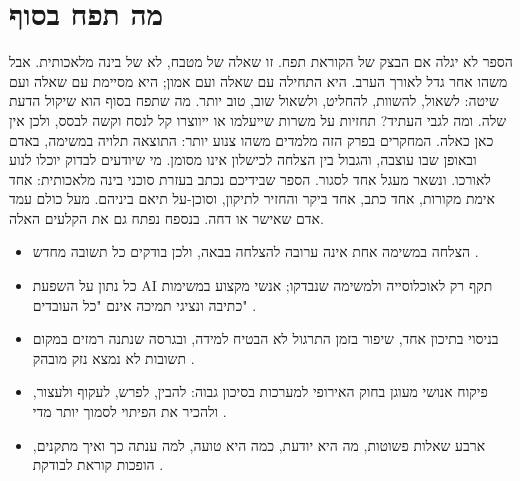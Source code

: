 \section{מה תפח בסוף}
הספר לא יגלה אם הבצק של הקוראת תפח. זו שאלה של מטבח, לא של בינה מלאכותית. אבל משהו אחר גדל לאורך הערב. היא התחילה עם שאלה ועם אמון; היא מסיימת עם שאלה ועם שיטה: לשאול, להשוות, להחליט, ולשאול שוב, טוב יותר. מה שתפח בסוף הוא שיקול הדעת שלה.
ומה לגבי העתיד? תחזיות על משרות שייעלמו או ייווצרו קל לנסח וקשה לבסס, ולכן אין כאן כאלה. המחקרים בפרק הזה מלמדים משהו צנוע יותר: התוצאה תלויה במשימה, באדם ובאופן שבו עוצבה, והגבול בין הצלחה לכישלון אינו מסומן. מי שיודעים לבדוק יוכלו לנוע לאורכו.
ונשאר מעגל אחד לסגור. הספר שבידיכם נכתב בעזרת סוכני בינה מלאכותית: אחד אימת מקורות, אחד כתב, אחד ביקר והחזיר לתיקון, וסוכן-על תיאם ביניהם. מעל כולם עמד אדם שאישר או דחה. בנספח נפתח גם את הקלעים האלה.
\begin{insightsbox}
\begin{itemize}
\item הצלחה במשימה אחת אינה ערובה להצלחה בבאה, ולכן בודקים כל תשובה מחדש \cite{S-ch07-04}.
\item כל נתון על השפעת AI תקף רק לאוכלוסייה ולמשימה שנבדקו; אנשי מקצוע במשימות כתיבה ונציגי תמיכה אינם "כל העובדים" \cite{S-ch07-01,S-ch07-03}.
\item בניסוי בתיכון אחד, שיפור בזמן התרגול לא הבטיח למידה, ובגרסה שנתנה רמזים במקום תשובות לא נמצא נזק מובהק \cite{S-ch07-10}.
\item פיקוח אנושי מעוגן בחוק האירופי למערכות בסיכון גבוה: להבין, לפרש, לעקוף ולעצור, ולהכיר את הפיתוי לסמוך יותר מדי \cite{S-ch07-08}.
\item ארבע שאלות פשוטות, מה היא יודעת, כמה היא טועה, למה ענתה כך ואיך מתקנים, הופכות קוראת לבודקת \cite{S-ch07-06}.
\end{itemize}
\end{insightsbox}
